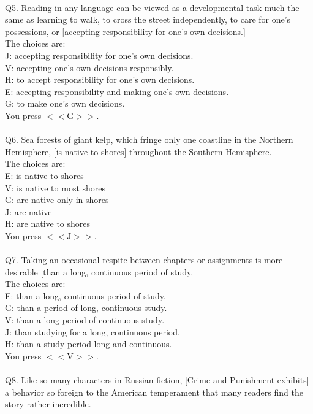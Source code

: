\documentclass[pdflatex,sn-nature]{sn-jnl}%
\theoremstyle{thmstyleone}%
\theoremstyle{thmstyletwo}%
\theoremstyle{thmstylethree}%
\begin{document}
 $~$\\ 
Q5. Reading in any language can be viewed as a developmental task much the same as learning to walk, to cross the street independently, to care for one's possessions, or [accepting responsibility for one's own decisions.] $~$\\ 
The choices are: $~$\\ 
J: accepting responsibility for one's own decisions. $~$\\ 
V: accepting one's own decisions responsibly. $~$\\ 
H: to accept responsibility for one's own decisions. $~$\\ 
E: accepting responsibility and making one's own decisions. $~$\\ 
G: to make one's own decisions. $~$\\ 
You press $<<$G$>>$. $~$\\ 
 $~$\\ 
Q6. Sea forests of giant kelp, which fringe only one coastline in the Northern Hemisphere, [is native to shores] throughout the Southern Hemisphere. $~$\\ 
The choices are: $~$\\ 
E: is native to shores $~$\\ 
V: is native to most shores $~$\\ 
G: are native only in shores $~$\\ 
J: are native $~$\\ 
H: are native to shores $~$\\ 
You press $<<$J$>>$. $~$\\ 
 $~$\\ 
Q7. Taking an occasional respite between chapters or assignments is more desirable [than a long, continuous period of study. $~$\\ 
The choices are: $~$\\ 
E: than a long, continuous period of study. $~$\\ 
G: than a period of long, continuous study. $~$\\ 
V: than a long period of continuous study. $~$\\ 
J: than studying for a long, continuous period. $~$\\ 
H: than a study period long and continuous. $~$\\ 
You press $<<$V$>>$. $~$\\ 
 $~$\\ 
Q8. Like so many characters in Russian fiction, [Crime and Punishment exhibits] a behavior so foreign to the American temperament that many readers find the story rather incredible. $~$\\ 
\end{document}
